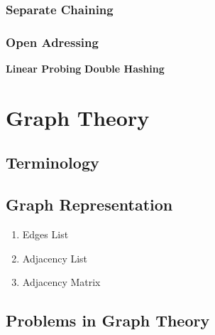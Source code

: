 \documentclass{article}
\begin{document}
\subsubsection{Separate Chaining}
\subsubsection{Open Adressing}

\textbf{Linear Probing}
\textbf{Double Hashing}

\section{Graph Theory}

\subsection{Terminology}
\subsection{Graph Representation}

\begin{enumerate}
    \item Edges List
    \item Adjacency List
    \item Adjacency Matrix
\end{enumerate}

\subsection{Problems in Graph Theory}
\end{document}
